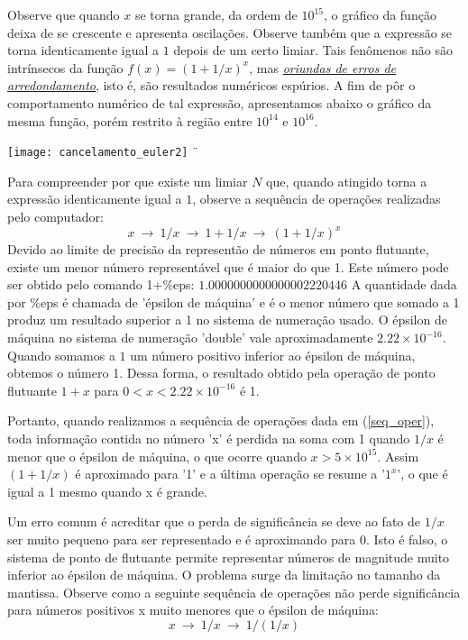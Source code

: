 \begin{ex}
Observe que quando $x$ se torna grande, da ordem de $10^{15}$, o gráfico da função deixa de se crescente e apresenta oscilações.  Observe também que a expressão se torna identicamente igual a $1$ depois de um certo limiar. Tais fenômenos não são intrínsecos da função $f(x)=(1+1/x)^x$, mas \emph{\uline{oriundas de erros de arredondamento}}, isto é, são resultados numéricos espúrios. A fim de pôr o comportamento numérico de tal expressão, apresentamos abaixo o gráfico da mesma função, porém restrito à região entre $10^{14}$ e $10^{16}$.

\texttt{[image: cancelamento\_euler2]}
¨%


Para compreender por que existe um limiar $N$ que, quando atingido torna a expressão identicamente igual a $1$, observe a sequência de operações realizadas pelo computador:
\begin{equation}\label{seq_oper}x~\longrightarrow~ 1/x ~\longrightarrow~ 1+1/x ~\longrightarrow~ (1+1/x)^x\end{equation}
Devido ao limite de precisão da representão de números em ponto flutuante, existe um menor número representável que é maior do que 1. Este número pode ser obtido pelo comando 1+\%eps:
$1.0000000000000002220446$
A quantidade dada por \%eps é chamada de 'épsilon de máquina' e é o menor número que somado a 1 produz um resultado superior a 1 no sistema de numeração usado. O épsilon de máquina no sistema de numeração 'double' vale aproximadamente $2.22\times 10^{-16}$.
Quando somamos a $1$ um número positivo inferior ao épsilon de máquina, obtemos o número 1. Dessa forma, o resultado obtido pela operação de ponto flutuante $1+x$ para $0<x<2.22 \times 10^{-16}$ é 1. 

Portanto, quando realizamos a sequência de operações dada em (\ref{seq_oper}), toda informação contida no número 'x' é perdida na soma com 1 quando $1/x$ é menor que o épsilon de máquina, o que ocorre quando $x>5\times 10^{15}$. Assim $(1+1/x)$ é aproximado para '1' e a última operação se resume a '$1^x$', o que é igual a 1 mesmo quando x é grande.

Um erro comum é acreditar que o perda de significância se deve ao fato de $1/x$ ser muito pequeno para ser representado e é aproximando para $0$. Isto é falso, o sistema de ponto de flutuante permite representar números de magnitude muito inferior ao épsilon de máquina. O problema surge da limitação no tamanho da mantissa. Observe como a seguinte sequência de operações não perde significância para números positivos x muito menores que o épsilon de máquina:
\begin{equation}\label{seq_oper2}x~\longrightarrow~ 1/x ~\longrightarrow~ 1/(1/x) \end{equation}
 

\end{ex}
